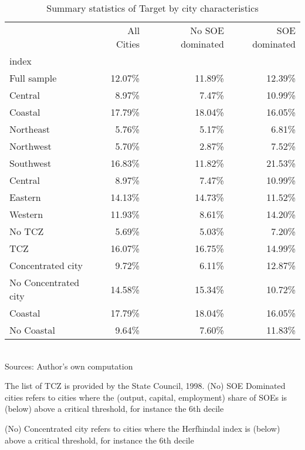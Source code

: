 \documentclass[12pt]{article}
\begin{document}
\begin{table}\centering
\caption{Summary statistics of Target by city characteristics}
\label{table_1}
\begin{adjustbox}{width=\textwidth, totalheight=\baselineskip,keepaspectratio}
\begin{tabular}{lrrr}
\toprule
{} & All Cities & No SOE dominated & SOE dominated \\
index                &            &                  &               \\
\midrule
Full sample          &     12.07\% &           11.89\% &        12.39\% \\
Central              &      8.97\% &            7.47\% &        10.99\% \\
Coastal              &     17.79\% &           18.04\% &        16.05\% \\
Northeast            &      5.76\% &            5.17\% &         6.81\% \\
Northwest            &      5.70\% &            2.87\% &         7.52\% \\
Southwest            &     16.83\% &           11.82\% &        21.53\% \\
Central              &      8.97\% &            7.47\% &        10.99\% \\
Eastern              &     14.13\% &           14.73\% &        11.52\% \\
Western              &     11.93\% &            8.61\% &        14.20\% \\
No TCZ               &      5.69\% &            5.03\% &         7.20\% \\
TCZ                  &     16.07\% &           16.75\% &        14.99\% \\
Concentrated city    &      9.72\% &            6.11\% &        12.87\% \\
No Concentrated city &     14.58\% &           15.34\% &        10.72\% \\
Coastal              &     17.79\% &           18.04\% &        16.05\% \\
No Coastal           &      9.64\% &            7.60\% &        11.83\% \\
\bottomrule
\end{tabular}
\end{adjustbox}
\begin{tablenotes} 
 \small 
 \item \\ 

Sources: Author's own computation 

The list of TCZ is provided by the State Council, 1998. 
(No) SOE Dominated cities refers to cities where the 
(output, capital, employment) share of SOEs is (below) above a critical threshold,
for instance the 6th decile

(No) Concentrated city refers to cities where the 
Herfhindal index is (below) above a critical threshold,
for instance the 6th decile
      
 
\end{tablenotes}
\end{table}
\end{document}
